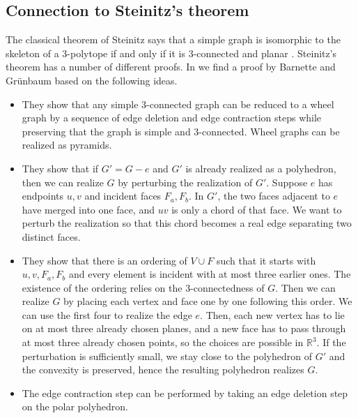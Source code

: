 \documentclass{article}
\newcommand{\R}[0]{\mathbb{R}}
\begin{document}
\subsection{Connection to Steinitz's theorem}\label{subs:steinitz}

The classical theorem of Steinitz says that a simple graph is isomorphic to the skeleton of a 3-polytope if and only if it is 3-connected and planar \cite{Steinitz1922}. Steinitz's theorem has a number of different proofs. In \cite{BarnetteGruenbaum1969Steinitz} we find a proof by Barnette and Grünbaum based on the following ideas.
\begin{itemize}
    \item They show that any simple 3-connected graph can be reduced to a wheel graph by a sequence of edge deletion and edge contraction steps while preserving that the graph is simple and 3-connected. Wheel graphs can be realized as pyramids.
    \item They show that if $G'=G-e$ and $G'$ is already realized as a polyhedron, then we can realize $G$ by perturbing the realization of $G'$.  Suppose $e$ has endpoints $u,v$ and incident faces $F_a,F_b$.  In $G'$, the two faces adjacent to $e$ have merged into one face, and $uv$ is only a chord of that face. We want to perturb the realization so that this chord becomes a real edge separating two distinct faces.
    \item They show that there is an ordering of $V\cup F$ such that it starts with $u,v,F_a,F_b$ and every element is incident with at most three earlier ones. The existence of the ordering relies on the 3-connectedness of $G$. Then we can realize $G$ by placing each vertex and face one by one following this order. We can use the first four to realize the edge $e$. Then, each new vertex has to lie on at most three already chosen planes, and a new face has to pass through at most three already chosen points, so the choices are possible in $\R^3$. If the perturbation is sufficiently small, we stay close to the polyhedron of $G'$ and the convexity is preserved, hence the resulting polyhedron realizes $G$. 
    \item The edge contraction step can be performed by taking an edge deletion step on the polar polyhedron. 
\end{itemize}
\end{document}
